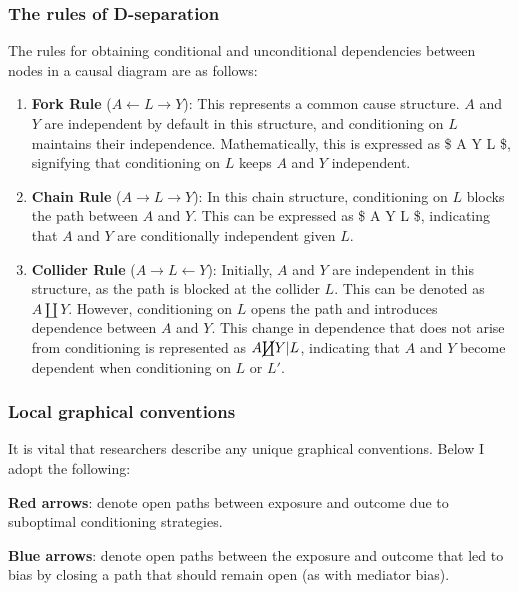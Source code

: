 \documentclass[
  singlecolumn,
  9pt]{article}
\begin{document}
\subsubsection{The rules of
D-separation}\label{the-rules-of-d-separation}

The rules for obtaining conditional and unconditional dependencies
between nodes in a causal diagram are as follows:

\begin{enumerate}
\def\labelenumi{\arabic{enumi}.}
\item
  \textbf{Fork Rule} (\(A \leftarrow L \rightarrow Y\)): This represents
  a common cause structure. \(A\) and \(Y\) are independent by default
  in this structure, and conditioning on \(L\) maintains their
  independence. Mathematically, this is expressed as \$ A \coprod Y
  \textbar{} L \$, signifying that conditioning on \(L\) keeps \(A\) and
  \(Y\) independent.
\item
  \textbf{Chain Rule} (\(A \rightarrow L \rightarrow Y\)): In this chain
  structure, conditioning on \(L\) blocks the path between \(A\) and
  \(Y\). This can be expressed as \$ A \coprod Y \textbar{} L \$,
  indicating that \(A\) and \(Y\) are conditionally independent given
  \(L\).
\item
  \textbf{Collider Rule} (\(A \rightarrow L \leftarrow Y\)): Initially,
  \(A\) and \(Y\) are independent in this structure, as the path is
  blocked at the collider \(L\). This can be denoted as \(A \coprod Y\).
  However, conditioning on \(L\) opens the path and introduces
  dependence between \(A\) and \(Y\). This change in dependence that
  does not arise from conditioning is represented as
  \(A \cancel{\coprod} Y | L\), indicating that \(A\) and \(Y\) become
  dependent when conditioning on \(L\) or \(L'\).
\end{enumerate}

\subsubsection{Local graphical
conventions}\label{local-graphical-conventions}

It is vital that researchers describe any unique graphical conventions.
Below I adopt the following:

\textbf{Red arrows}: denote open paths between exposure and outcome due
to suboptimal conditioning strategies.

\textbf{Blue arrows}: denote open paths between the exposure and outcome
that led to bias by closing a path that should remain open (as with
mediator bias).
\end{document}
